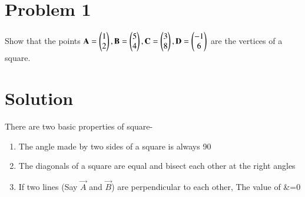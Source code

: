 \documentclass[journal,12pt,twocolumn]{IEEEtran}
\begin{document}
\section{Problem 1}
Show that the points $\mathbf {A}=\begin{pmatrix}1\\2\end{pmatrix},
\mathbf {B}=\begin{pmatrix}5\\4\end{pmatrix},
\mathbf {C}=\begin{pmatrix}3\\8\end{pmatrix},
\mathbf {D}=\begin{pmatrix}-1\\6\end{pmatrix}$ are the vertices of a square.
\section{Solution}
There are two basic properties of square-
\begin{lemma}
\begin{enumerate}


     \item  The angle made by two sides of a square is always 90\degree
     \item  The diagonals of a square are equal and bisect each other at the right angles
     \item  If two lines (Say {$\vec{A}$} and {$\vec{B}$}) are perpendicular to each   other, The value of &=0
     
\end{enumerate}
\end{lemma}
\end{document}
